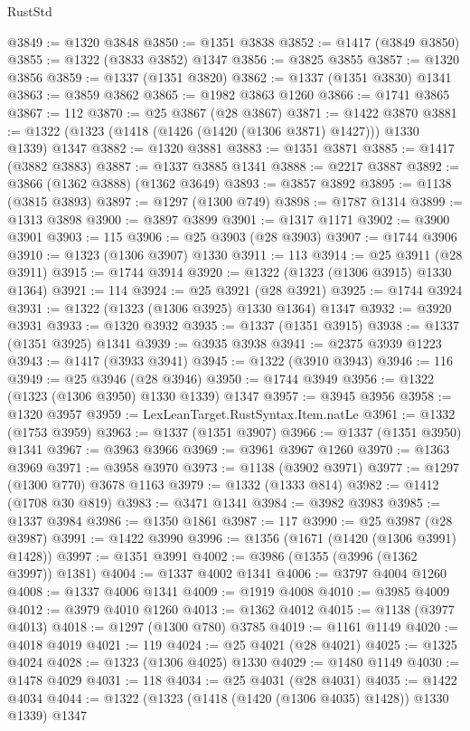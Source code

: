 \begin{lexlean}{RustStd}
\begin{coremodule}
@3849 := @1320 @3848
@3850 := @1351 @3838
@3852 := @1417 (@3849 @3850)
@3855 := @1322 (@3833 @3852) @1347
@3856 := @3825 @3855
@3857 := @1320 @3856
@3859 := @1337 (@1351 @3820)
@3862 := @1337 (@1351 @3830) @1341
@3863 := @3859 @3862
@3865 := @1982 @3863 @1260
@3866 := @1741 @3865
@3867 := 112
@3870 := @25 @3867 (@28 @3867)
@3871 := @1422 @3870
@3881 := @1322 (@1323 (@1418 (@1426 (@1420 (@1306 @3871) @1427))) @1330 @1339) @1347
@3882 := @1320 @3881
@3883 := @1351 @3871
@3885 := @1417 (@3882 @3883)
@3887 := @1337 @3885 @1341
@3888 := @2217 @3887
@3892 := @3866 (@1362 @3888) (@1362 @3649)
@3893 := @3857 @3892
@3895 := @1138 (@3815 @3893)
@3897 := @1297 (@1300 @749)
@3898 := @1787 @1314
@3899 := @1313 @3898
@3900 := @3897 @3899
@3901 := @1317 @1171
@3902 := @3900 @3901
@3903 := 115
@3906 := @25 @3903 (@28 @3903)
@3907 := @1744 @3906
@3910 := @1323 (@1306 @3907) @1330
@3911 := 113
@3914 := @25 @3911 (@28 @3911)
@3915 := @1744 @3914
@3920 := @1322 (@1323 (@1306 @3915) @1330 @1364)
@3921 := 114
@3924 := @25 @3921 (@28 @3921)
@3925 := @1744 @3924
@3931 := @1322 (@1323 (@1306 @3925) @1330 @1364) @1347
@3932 := @3920 @3931
@3933 := @1320 @3932
@3935 := @1337 (@1351 @3915)
@3938 := @1337 (@1351 @3925) @1341
@3939 := @3935 @3938
@3941 := @2375 @3939 @1223
@3943 := @1417 (@3933 @3941)
@3945 := @1322 (@3910 @3943)
@3946 := 116
@3949 := @25 @3946 (@28 @3946)
@3950 := @1744 @3949
@3956 := @1322 (@1323 (@1306 @3950) @1330 @1339) @1347
@3957 := @3945 @3956
@3958 := @1320 @3957
@3959 := LexLeanTarget.RustSyntax.Item.natLe
@3961 := @1332 (@1753 @3959)
@3963 := @1337 (@1351 @3907)
@3966 := @1337 (@1351 @3950) @1341
@3967 := @3963 @3966
@3969 := @3961 @3967 @1260
@3970 := @1363 @3969
@3971 := @3958 @3970
@3973 := @1138 (@3902 @3971)
@3977 := @1297 (@1300 @770) @3678 @1163
@3979 := @1332 (@1333 @814)
@3982 := @1412 (@1708 @30 @819)
@3983 := @3471 @1341
@3984 := @3982 @3983
@3985 := @1337 @3984
@3986 := @1350 @1861
@3987 := 117
@3990 := @25 @3987 (@28 @3987)
@3991 := @1422 @3990
@3996 := @1356 (@1671 (@1420 (@1306 @3991) @1428))
@3997 := @1351 @3991
@4002 := @3986 (@1355 (@3996 (@1362 @3997)) @1381)
@4004 := @1337 @4002 @1341
@4006 := @3797 @4004 @1260
@4008 := @1337 @4006 @1341
@4009 := @1919 @4008
@4010 := @3985 @4009
@4012 := @3979 @4010 @1260
@4013 := @1362 @4012
@4015 := @1138 (@3977 @4013)
@4018 := @1297 (@1300 @780) @3785
@4019 := @1161 @1149
@4020 := @4018 @4019
@4021 := 119
@4024 := @25 @4021 (@28 @4021)
@4025 := @1325 @4024
@4028 := @1323 (@1306 @4025) @1330
@4029 := @1480 @1149
@4030 := @1478 @4029
@4031 := 118
@4034 := @25 @4031 (@28 @4031)
@4035 := @1422 @4034
@4044 := @1322 (@1323 (@1418 (@1420 (@1306 @4035) @1428)) @1330 @1339) @1347

\end{coremodule}
\end{lexlean}

